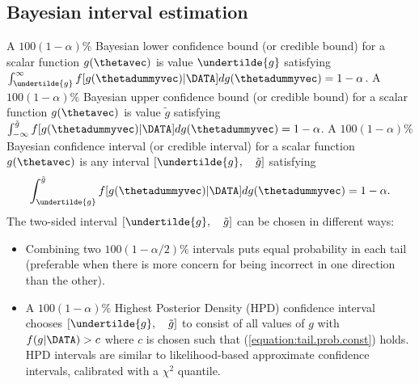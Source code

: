 \subsection{Bayesian interval estimation}

A $100(1-\alpha)\%$ 
Bayesian lower confidence bound (or credible bound)
for a scalar function $g(\thetavec)$ is 
value $\undertilde{g}$ satisfying $\int_{\undertilde{g}}^{\infty}
f[g(\thetadummyvec) | \DATA ] d g(\thetadummyvec)=1-\alpha$.
A $100(1-\alpha)\%$ Bayesian upper confidence bound (or credible bound)
for a scalar function $g(\thetavec)$ is value $\tilde{g}$ satisfying
$\int_{-\infty}^{\tilde{g}}
f[g(\thetadummyvec) | \DATA ] d g(\thetadummyvec)=1-\alpha$.
A $100(1-\alpha)\%$ Bayesian confidence interval (or credible interval)
for a scalar function $g(\thetavec)$ is 
any interval $[\undertilde{g}, \quad \tilde{g}]$ satisfying
\begin{equation}
\label{equation:tail.prob.const}
\int_{\undertilde{g}}^{\tilde{g}}
f[g(\thetadummyvec) | \DATA ] d g(\thetadummyvec)=1-\alpha.
\end{equation}
The two-sided interval $[\undertilde{g}, \quad \tilde{g}]$
can be chosen in different ways:
\begin{itemize} 
\item
Combining two $100(1-\alpha/2)\%$ intervals puts equal probability in
each tail (preferable when there is more concern for 
being incorrect in one direction than the other).
\item
A $100(1-\alpha)\%$ Highest Posterior Density (HPD) confidence
interval chooses $[\undertilde{g}, \quad \tilde{g}]$ to consist of
all values of $g$ with $f(g |\DATA) > c$ where $c$ is chosen such
that (\ref{equation:tail.prob.const}) holds.  HPD intervals are
similar to likelihood-based approximate confidence intervals,
calibrated with a $\chi^{2}$ quantile.
\end{itemize}

